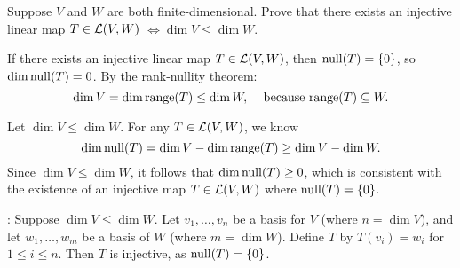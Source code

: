 \begin{xrcs}
  Suppose $V$ and $W$ are both finite-dimensional. Prove that there exists an injective linear map $T \in \mathcal{L}(V,W)$
  $
    \iff \dim V \leq \dim W.
  $
\end{xrcs}
\begin{prf}
  \Rightarrowdirection If there exists an injective linear map $T \in \mathcal{L}(V,W)$, then $\operatorname{null}(T) = \{0\}$, so $\dim \operatorname{null}(T) = 0$. By the rank-nullity theorem:
  \begin{equation}
    \dim V = \dim \myrange(T) \leq \dim W, \quad $ because $ \myrange(T) \subseteq W.
  \end{equation}

  \Leftarrowdirection Let $\dim V \leq \dim W$. For any $T \in \mathcal{L}(V,W)$, we know
  \begin{equation}
    \dim \operatorname{null}(T) = \dim V - \dim \operatorname{range}(T) \geq \dim V - \dim W.
  \end{equation}
  Since $\dim V \leq \dim W$, it follows that $\dim \operatorname{null}(T) \geq 0$, which is consistent with the existence of an injective map $T \in \mathcal{L}(V,W)$ where $\operatorname{null}(T) = \{0\}$.

  :
  Suppose $\dim V \leq \dim W$. Let $v_1, \dots, v_n$ be a basis for $V$ (where $n = \dim V$), and let $w_1, \dots, w_m$ be a basis of $W$ (where $m = \dim W$). Define $T$ by $T(v_i) = w_i$ for $1 \leq i \leq n$. Then $T$ is injective, as $\operatorname{null}(T) = \{0\}$.
\end{prf}

